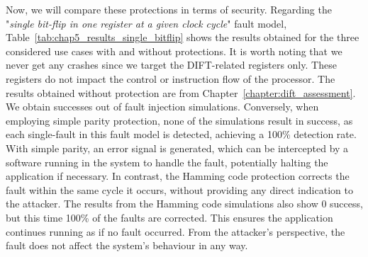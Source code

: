 Now, we will compare these protections in terms of security.
Regarding the "\textit{single bit-flip in one register at a given clock cycle}" fault model, Table~\ref{tab:chap5_results_single_bitflip} shows the results obtained for the three considered use cases with and without protections. It is worth noting that we never get any crashes since we target the DIFT-related registers only. These registers do not impact the control or instruction flow of the processor.
The results obtained without protection are from Chapter~\ref{chapter:dift_assessment}. We obtain  successes out of  fault injection simulations.
Conversely, when employing simple parity protection, none of the  simulations result in success, as each single-fault in this fault model is detected, achieving a 100\% detection rate. With simple parity, an error signal is generated, which can be intercepted by a software running in the system to handle the fault, potentially halting the application if necessary. In contrast, the Hamming code protection corrects the fault within the same cycle it occurs, without providing any direct indication to the attacker. The results from the Hamming code simulations also show 0 success, but this time 100\% of the faults are corrected. This ensures the application continues running as if no fault occurred. From the attacker’s perspective, the fault does not affect the system’s behaviour in any way.

